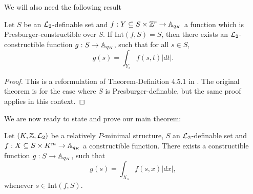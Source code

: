 We will also need the following result
\begin{thm}\label{thm:presburger-int}
Let $S$ be an $\Lm_2$-definable set and $f: Y \subseteq S \times \ZZ^r \to \AA_{q_K}$ a function which is Presburger-constructible over $S$. If $\text{Int}(f,S) =S$, then there exists an $\Lm_2$-constructible function $g:S \to \AA_{q_K}$, such that for all $s \in S$,
\[ g(s) = \int_{Y_s} f(s,t)|dt|.\]  
\end{thm}
\begin{proof}
This is a reformulation of Theorem-Definition 4.5.1 in \cite{clu-loe-08}. The original theorem is for the case where $S$ is Presburger-definable, but the same proof applies in this context.
\end{proof}
We are now ready to state and prove our main theorem:
\begin{thm}
Let $(K, \Z, \Lm_2)$ be a relatively $P$-minimal structure, $S$ an $\Lm_2$-definable set and $f: X \subseteq S\times K^m \to \AA_{q_K}$ a constructible function.  There exists a constructible function $g: S \to \AA_{q_K}$, such that
\[g(s) = \int_{X_s} f(s,x)|dx|,\]
whenever $s \in \text{Int}(f,S)$.
\end{thm}

